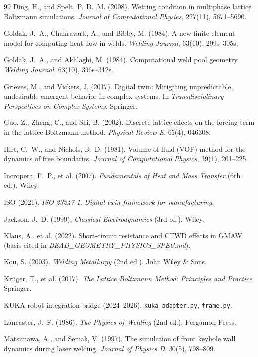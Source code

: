 \documentclass[11pt,a4paper]{article}
\begin{document}
\begin{thebibliography}{99}
Ding, H., and Spelt, P.~D.~M. (2008).
Wetting condition in multiphase lattice Boltzmann simulations.
\textit{Journal of Computational Physics}, 227(11), 5671--5690.

Goldak, J.~A., Chakravarti, A., and Bibby, M. (1984).
A new finite element model for computing heat flow in welds.
\textit{Welding Journal}, 63(10), 299s--305s.

Goldak, J.~A., and Akhlaghi, M. (1984).
Computational weld pool geometry.
\textit{Welding Journal}, 63(10), 306s--312s.

Grieves, M., and Vickers, J. (2017).
Digital twin: Mitigating unpredictable, undesirable emergent behavior in complex systems.
In \textit{Transdisciplinary Perspectives on Complex Systems}. Springer.

Guo, Z., Zheng, C., and Shi, B. (2002).
Discrete lattice effects on the forcing term in the lattice Boltzmann method.
\textit{Physical Review E}, 65(4), 046308.

Hirt, C.~W., and Nichols, B.~D. (1981).
Volume of fluid (VOF) method for the dynamics of free boundaries.
\textit{Journal of Computational Physics}, 39(1), 201--225.

Incropera, F.~P., et al. (2007).
\textit{Fundamentals of Heat and Mass Transfer} (6th ed.). Wiley.

ISO (2021).
\textit{ISO 23247-1: Digital twin framework for manufacturing}.

Jackson, J.~D. (1999).
\textit{Classical Electrodynamics} (3rd ed.). Wiley.

Klaus, A., et al. (2022).
Short-circuit resistance and CTWD effects in GMAW
(basis cited in \textit{BEAD\_GEOMETRY\_PHYSICS\_SPEC.md}).

Kou, S. (2003).
\textit{Welding Metallurgy} (2nd ed.). John Wiley \& Sons.

Kr\"uger, T., et al. (2017).
\textit{The Lattice Boltzmann Method: Principles and Practice}. Springer.

KUKA robot integration bridge (2024--2026).
\texttt{kuka\_adapter.py}, \texttt{frame.py}.

Lancaster, J.~F. (1986).
\textit{The Physics of Welding} (2nd ed.). Pergamon Press.

Matsunawa, A., and Semak, V. (1997).
The simulation of front keyhole wall dynamics during laser welding.
\textit{Journal of Physics D}, 30(5), 798--809.


\end{thebibliography}
\end{document}
